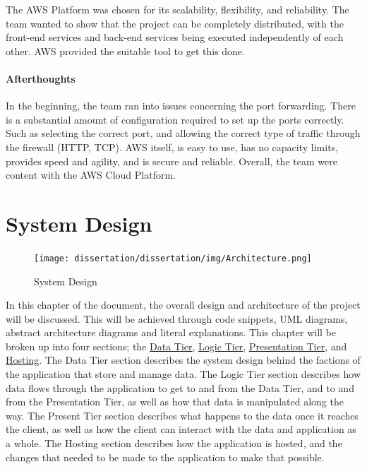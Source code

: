 \bigskip

The AWS Platform was chosen for its scalability, flexibility, and reliability. The team wanted to show that the project can be completely distributed, with the front-end services and back-end services being executed independently of each other. AWS provided the suitable tool to get this done.


\subsubsection{Afterthoughts}
In the beginning, the team ran into issues concerning the port forwarding. There is a substantial amount of configuration required to set up the ports correctly. Such as selecting the correct port, and allowing the correct type of traffic through the firewall (HTTP, TCP). AWS itself, is easy to use, has no capacity limits, provides speed and agility, and is secure and reliable. Overall, the team were content with the AWS Cloud Platform.

\chapter{System Design}
\label{sec:SystemDesign}


\begin{figure}[H]
    \centering
    \texttt{[image: dissertation/dissertation/img/Architecture.png]}
    \caption{System Design}
    \label{fig:my_label}
\end{figure}

\bigskip
In this chapter of the document, the overall design and architecture of the project will be discussed.  This will be achieved through code snippets, UML diagrams, abstract architecture diagrams and literal explanations. This chapter will be broken up into four sections; the  \hyperref[sec:SystemDesignDataTier]{\underline{Data Tier}}, \hyperref[sec:SystemDesignLogic]{\underline{Logic Tier}}, \hyperref[sec:SystemDesignPresentationTier]{\underline{Presentation Tier}}, and \hyperref[sec:SystemDesignHosting]{\underline{Hosting}}. The Data Tier section describes the system design behind the factions of the application that store and manage data. The Logic Tier section describes how data flows through the application to get to and from the Data Tier, and to and from the Presentation Tier, as well as how that data is manipulated along the way. The Present Tier section describes what happens to the data once it reaches the client, as well as how the client can interact with the data and application as a whole. The Hosting section describes how the application is hosted, and the changes that needed to be made to the application to make that possible.


